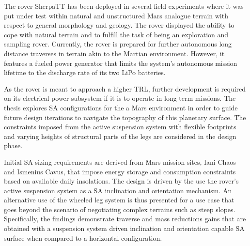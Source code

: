 The rover SherpaTT has been deployed in several field experiments where it was put under test within natural and unstructured Mars analogue terrain with respect to general morphology and geology. The rover displayed the ability to cope with natural terrain and to fulfill the task of being an exploration and sampling rover. Currently, the rover is prepared for further autonomous long distance traverses in terrain akin to the Martian environment. However, it features a fueled power generator that limits the system's autonomous mission lifetime to the discharge rate of its two LiPo batteries.

As the rover is meant to approach a higher \ac{TRL}, further development is required on its electrical power subsystem if it is to operate in long term missions. The thesis explores \ac{SA} configurations for the a Mars environment in order to guide future design iterations to navigate the topography of this planetary surface. The constraints imposed from the active suspension system with flexible footprints and varying heights of structural parts of the legs are considered in the design phase.

Initial \ac{SA} sizing requirements are derived from Mars mission sites, Iani Chaos and Ismenius Cavus, that impose energy storage and consumption constraints based on available daily insolations. The design is driven by the use the rover's active suspension system as a \ac{SA} inclination and orientation mechanism. An alternative use of the wheeled leg system is thus presented for a use case that goes beyond the scenario of negotiating complex terrains such as steep slopes. Specifically, the findings demonstrate traverse and mass reductions gains that are obtained with a suspension system driven inclination and orientation capable \ac{SA} surface when compared to a horizontal configuration.
